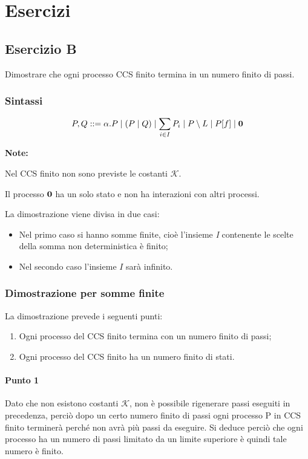 \section{Esercizi}
\subsection{Esercizio B} 
Dimostrare che ogni processo CCS finito termina in un numero finito di passi.

\subsubsection{Sintassi}

\[
	P, Q ::=
	\alpha.P\mid
	(P\mid Q)\mid
	\sum_{i\in I} P_i\mid
	P\setminus L\mid
	P[f]\mid
	\mathbf{0}
\] 

\textbf{Note:}

Nel CCS finito non sono previste le costanti $\mathcal{K}$.
 
Il processo \(\mathbf{0}\) ha un solo stato e non ha interazioni con altri processi.

La dimostrazione viene divisa in due casi: 
\begin{itemize}
	\item Nel primo caso si hanno somme finite, cioè l'insieme \textit{I} contenente le scelte della somma non deterministica è finito;
	\item Nel secondo caso l'insieme \(I\) sarà infinito.
\end{itemize} 
\subsubsection{Dimostrazione per somme finite}

La dimostrazione prevede i seguenti punti:
\begin{enumerate}
	\item Ogni processo del CCS finito termina con un numero finito di passi;
	\item Ogni processo del CCS finito ha un numero finito di stati.
\end{enumerate}

\paragraph{Punto 1} \mbox{}

Dato che non esistono costanti $\mathcal{K}$, non è possibile rigenerare passi eseguiti in precedenza, perciò dopo un certo numero finito di passi ogni processo P in CCS finito terminerà perché non avrà più passi da eseguire. Si deduce perciò che ogni processo ha un numero di passi limitato da un limite superiore è quindi tale numero è finito.

